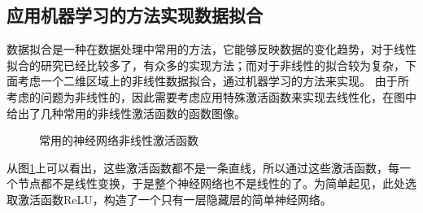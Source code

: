 \documentclass[a4paper,11pt]{ctexart}
\theoremstyle{break}
\theoremstyle{plain}
\begin{document}
\subsection{应用机器学习的方法实现数据拟合}
数据拟合是一种在数据处理中常用的方法，它能够反映数据的变化趋势，对于线性拟合的研究已经比较多了，有众多的实现方法；而对于非线性的拟合较为复杂，下面考虑一个二维区域上的非线性数据拟合，通过机器学习的方法来实现。
由于所考虑的问题为非线性的，因此需要考虑应用特殊激活函数来实现去线性化，在图中给出了几种常用的非线性激活函数的函数图像。
\begin{figure}[h]
	\centering
	\centering
	\caption{常用的神经网络非线性激活函数\label{fig:function}}
\end{figure}
从图\ref{fig:function}上可以看出，这些激活函数都不是一条直线，所以通过这些激活函数，每一个节点都不是线性变换，于是整个神经网络也不是线性的了。为简单起见，此处选取激活函数ReLU，构造了一个只有一层隐藏层的简单神经网络。
\end{document}
